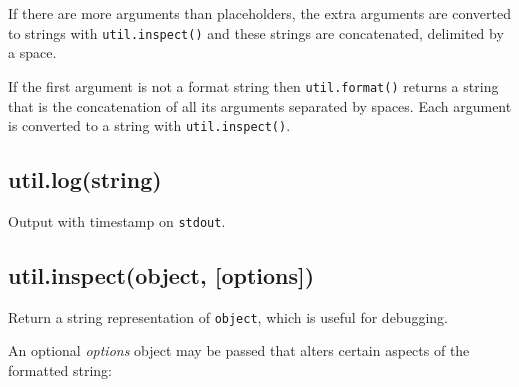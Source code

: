 If there are more arguments than placeholders, the extra arguments are
converted to strings with \texttt{util.inspect()} and these strings are
concatenated, delimited by a space.

\begin{Shaded}
\end{Shaded}

If the first argument is not a format string then \texttt{util.format()}
returns a string that is the concatenation of all its arguments
separated by spaces. Each argument is converted to a string with
\texttt{util.inspect()}.

\begin{Shaded}
\begin{Highlighting}[]
\NormalTok{(}\NormalTok{, }\NormalTok{, }\NormalTok{); }
\end{Highlighting}
\end{Shaded}

\subsection{util.log(string)}\label{util.logstring}

Output with timestamp on \texttt{stdout}.

\begin{Shaded}
\begin{Highlighting}[]
\NormalTok{(}\NormalTok{(}\NormalTok{);}
\end{Highlighting}
\end{Shaded}

\subsection{util.inspect(object,
{[}options{]})}\label{util.inspectobject-options}

Return a string representation of \texttt{object}, which is useful for
debugging.

An optional \emph{options} object may be passed that alters certain
aspects of the formatted string:

